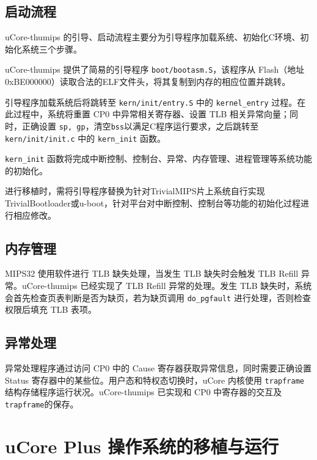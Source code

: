 \subsection{启动流程}
uCore-thumips 的引导、启动流程主要分为引导程序加载系统、初始化C环境、初始化系统三个步骤。

uCore-thumips 提供了简易的引导程序 \texttt{boot/bootasm.S}，该程序从 Flash（地址0xBE000000）读取合法的ELF文件头，将其复制到内存的相应位置并跳转。

引导程序加载系统后将跳转至 \texttt{kern/init/entry.S} 中的 \texttt{kernel\_entry} 过程。在此过程中，系统将重置 CP0 中异常相关寄存器、设置 TLB 相关异常向量；同时，正确设置 \texttt{sp, gp}，清空\texttt{bss}以满足C程序运行要求，之后跳转至 \texttt{kern/init/init.c} 中的 \texttt{kern\_init} 函数。

\texttt{kern\_init} 函数将完成中断控制、控制台、异常、内存管理、进程管理等系统功能的初始化。

进行移植时，需将引导程序替换为针对TrivialMIPS片上系统自行实现TrivialBootloader或u-boot，针对平台对中断控制、控制台等功能的初始化过程进行相应修改。

\subsection{内存管理}

MIPS32 使用软件进行 TLB 缺失处理，当发生 TLB 缺失时会触发 TLB Refill 异常。uCore-thumips 已经实现了 TLB Refill 异常的处理。发生 TLB 缺失时，系统会首先检查页表判断是否为缺页，若为缺页调用 \texttt{do\_pgfault} 进行处理，否则检查权限后填充 TLB 表项。
\subsection{异常处理}
异常处理程序通过访问 CP0 中的 Cause 寄存器获取异常信息，同时需要正确设置 Status 寄存器中的某些位。用户态和特权态切换时，uCore 内核使用 \texttt{trapframe} 结构存储程序运行状况。uCore-thumips 已实现和 CP0 中寄存器的交互及\texttt{trapframe}的保存。

\section{uCore Plus 操作系统的移植与运行}